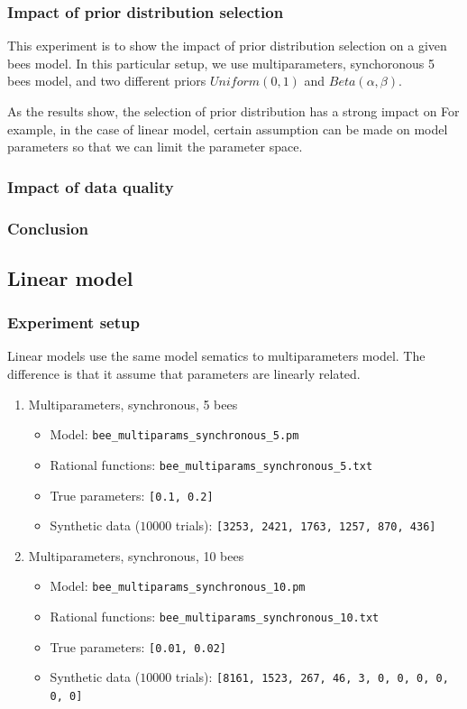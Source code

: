 \documentclass[12pt]{article}
\theoremstyle{definition}
\begin{document}
\subsubsection{Impact of prior distribution selection}
This experiment is to show the impact of prior distribution selection on a given
bees model. In this particular setup, we use multiparameters, synchoronous 5
bees model, and two different priors $Uniform(0,1)$ and $Beta(\alpha, \beta)$.


As the results show, the selection of prior distribution has a strong impact on 
For example, in the case of linear model, certain assumption can be made on
model parameters so that we can limit the parameter space. 

\subsubsection{Impact of data quality}


\subsubsection{Conclusion}

\subsection{Linear model}
\subsubsection{Experiment setup}
Linear models use the same model sematics to multiparameters model. The
difference is that it assume that parameters are linearly related.
\begin{enumerate}
\item Multiparameters, synchronous, 5 bees
  \begin{itemize}
  \item Model: \texttt{bee\_multiparams\_synchronous\_5.pm}
  \item Rational functions: \texttt{bee\_multiparams\_synchronous\_5.txt}
  \item True parameters: \texttt{[0.1, 0.2]}
  \item Synthetic data ($10000$ trials): \texttt{[3253, 2421, 1763, 1257, 870, 436]}
  \end{itemize}
\item Multiparameters, synchronous, 10 bees
  \begin{itemize}
  \item Model: \texttt{bee\_multiparams\_synchronous\_10.pm}
  \item Rational functions: \texttt{bee\_multiparams\_synchronous\_10.txt}
  \item True parameters: \texttt{[0.01, 0.02]}
  \item Synthetic data ($10000$ trials): \texttt{[8161, 1523, 267, 46, 3, 0, 0, 0, 0, 0, 0]}
  \end{itemize}
\end{enumerate}
\end{document}
